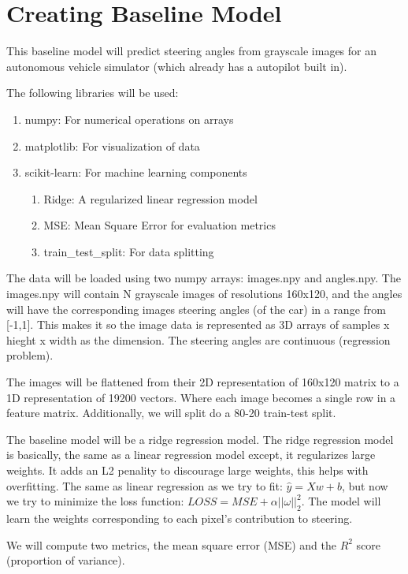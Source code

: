 \documentclass{article} %
\begin{document}
 
\section{Creating Baseline Model}

This baseline model will predict steering angles from grayscale images for an autonomous
vehicle simulator (which already has a autopilot built in). 

The following libraries will be used:
\begin{enumerate}
  \item numpy: For numerical operations on arrays
  \item matplotlib: For visualization of data
  \item scikit-learn: For machine learning components
  \begin{enumerate}
    \item Ridge: A regularized linear regression model
    \item MSE: Mean Square Error for evaluation metrics
    \item train\_test\_split: For data splitting
  \end{enumerate}
\end{enumerate}

The data will be loaded using two numpy arrays: images.npy and angles.npy. The images.npy
will contain N grayscale images of resolutions 160x120, and the angles will have the corresponding
images steering angles (of the car) in a range from [-1,1]. This makes it so the image data is 
represented as 3D arrays of samples x hieght x width as the dimension. The steering angles are
continuous (regression problem). 

The images will be flattened from their 2D representation of 160x120 matrix to a 1D representation
of 19200 vectors. Where each image becomes a single row in a feature matrix. Additionally,
we will split do a 80-20 train-test split.

The baseline model will be a ridge regression model. The ridge regression model is basically, the
same as a linear regression model except, it regularizes large weights. It adds an L2 penality to
discourage large weights, this helps with overfitting. The same as linear regression as we try to
fit: $\hat{y} = Xw + b$, but now we try to minimize the loss function: $LOSS = MSE + \alpha 
||\omega||^2_2$. The model will learn the weights corresponding to each pixel's contribution to 
steering.

We will compute two metrics, the mean square error (MSE) and the $R^2$ score (proportion of variance). 
\end{document}
